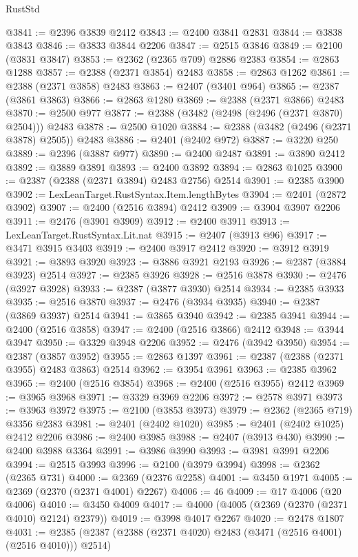 \begin{lexlean}{RustStd}
\begin{coremodule}
@3841 := @2396 @3839 @2412
@3843 := @2400 @3841 @2831
@3844 := @3838 @3843
@3846 := @3833 @3844 @2206
@3847 := @2515 @3846
@3849 := @2100 (@3831 @3847)
@3853 := @2362 (@2365 @709) @2886 @2383
@3854 := @2863 @1288
@3857 := @2388 (@2371 @3854) @2483
@3858 := @2863 @1262
@3861 := @2388 (@2371 @3858) @2483
@3863 := @2407 (@3401 @964)
@3865 := @2387 (@3861 @3863)
@3866 := @2863 @1280
@3869 := @2388 (@2371 @3866) @2483
@3870 := @2500 @977
@3877 := @2388 (@3482 (@2498 (@2496 (@2371 @3870) @2504))) @2483
@3878 := @2500 @1020
@3884 := @2388 (@3482 (@2496 (@2371 @3878) @2505)) @2483
@3886 := @2401 (@2402 @972)
@3887 := @3220 @250
@3889 := @2396 (@3887 @977)
@3890 := @2400 @2487
@3891 := @3890 @2412
@3892 := @3889 @3891
@3893 := @2400 @3892
@3894 := @2863 @1025
@3900 := @2387 (@2388 (@2371 @3894) @2483 @2756) @2514
@3901 := @2385 @3900
@3902 := LexLeanTarget.RustSyntax.Item.lengthBytes
@3904 := @2401 (@2872 @3902)
@3907 := @2400 (@2516 @3894) @2412
@3909 := @3904 @3907 @2206
@3911 := @2476 (@3901 @3909)
@3912 := @2400 @3911
@3913 := LexLeanTarget.RustSyntax.Lit.nat
@3915 := @2407 (@3913 @96)
@3917 := @3471 @3915 @3403
@3919 := @2400 @3917 @2412
@3920 := @3912 @3919
@3921 := @3893 @3920
@3923 := @3886 @3921 @2193
@3926 := @2387 (@3884 @3923) @2514
@3927 := @2385 @3926
@3928 := @2516 @3878
@3930 := @2476 (@3927 @3928)
@3933 := @2387 (@3877 @3930) @2514
@3934 := @2385 @3933
@3935 := @2516 @3870
@3937 := @2476 (@3934 @3935)
@3940 := @2387 (@3869 @3937) @2514
@3941 := @3865 @3940
@3942 := @2385 @3941
@3944 := @2400 (@2516 @3858)
@3947 := @2400 (@2516 @3866) @2412
@3948 := @3944 @3947
@3950 := @3329 @3948 @2206
@3952 := @2476 (@3942 @3950)
@3954 := @2387 (@3857 @3952)
@3955 := @2863 @1397
@3961 := @2387 (@2388 (@2371 @3955) @2483 @3863) @2514
@3962 := @3954 @3961
@3963 := @2385 @3962
@3965 := @2400 (@2516 @3854)
@3968 := @2400 (@2516 @3955) @2412
@3969 := @3965 @3968
@3971 := @3329 @3969 @2206
@3972 := @2578 @3971
@3973 := @3963 @3972
@3975 := @2100 (@3853 @3973)
@3979 := @2362 (@2365 @719) @3356 @2383
@3981 := @2401 (@2402 @1020)
@3985 := @2401 (@2402 @1025) @2412 @2206
@3986 := @2400 @3985
@3988 := @2407 (@3913 @430)
@3990 := @2400 @3988 @3364
@3991 := @3986 @3990
@3993 := @3981 @3991 @2206
@3994 := @2515 @3993
@3996 := @2100 (@3979 @3994)
@3998 := @2362 (@2365 @731)
@4000 := @2369 (@2376 @2258)
@4001 := @3450 @1971
@4005 := @2369 (@2370 (@2371 @4001) @2267)
@4006 := 46
@4009 := @17 @4006 (@20 @4006)
@4010 := @3450 @4009
@4017 := @4000 (@4005 (@2369 (@2370 (@2371 @4010) @2124) @2379))
@4019 := @3998 @4017 @2267
@4020 := @2478 @1807
@4031 := @2385 (@2387 (@2388 (@2371 @4020) @2483 (@3471 (@2516 @4001) (@2516 @4010))) @2514)

\end{coremodule}
\end{lexlean}
